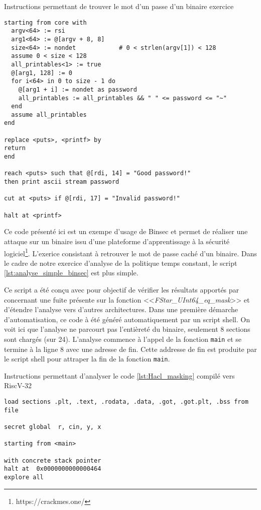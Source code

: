 \begin{listing}[!ht]
    \caption{Instructions permettant de trouver le mot d'un passe d'un binaire exercice}
    \label{lst:exemple_binsec}
    \begin{verbatim}
starting from core with
  argv<64> := rsi
  arg1<64> := @[argv + 8, 8]
  size<64> := nondet            # 0 < strlen(argv[1]) < 128
  assume 0 < size < 128
  all_printables<1> := true
  @[arg1, 128] := 0
  for i<64> in 0 to size - 1 do
    @[arg1 + i] := nondet as password
    all_printables := all_printables && " " <= password <= "~"
  end
  assume all_printables
end

replace <puts>, <printf> by
return
end

reach <puts> such that @[rdi, 14] = "Good password!"
then print ascii stream password

cut at <puts> if @[rdi, 17] = "Invalid password!"

halt at <printf>
\end{verbatim}
\end{listing}

Ce code présenté ici est un exempe d'usage de Binsec et permet de réaliser une attaque sur un binaire issu d'une plateforme d'apprentissage à la sécurité logiciel\footnote{https://crackmes.one/}. L'exerice consistant à retrouver le mot de passe caché d'un binaire. Dans le cadre de notre exercice d'analyse de la politique temps constant, le script \ref{lst:analyse_simple_binsec} est plus simple.\medbreak

Ce script a été conçu avec pour objectif de vérifier les résultats apportés par \cite{schneider2024breakingbadcompilersbreak} concernant une fuite présente sur la fonction <<\textit{FStar\_UInt64\_eq\_mask}>> et d'étendre l'analyse vers d'autres architectures. Dans une première démarche d'automatisation, ce code à été généré automatiquement par un script shell. On voit ici que l'analyse ne parcourt pas l'entièreté du binaire, seulement 8 sections sont chargés (sur 24). L'analyse commence à l'appel de la fonction \texttt{main} et se termine à la ligne 8 avec une adresse de fin. Cette addresse de fin est produite par le script shell pour attraper la fin de la fonction \texttt{main}. 

\begin{listing}[!ht]
    \caption{Instructions permettant d'analyser le code \ref{lst:Hacl_masking} compilé vers RiscV-32}
    \label{lst:analyse_simple_binsec}
    \begin{verbatim}
load sections .plt, .text, .rodata, .data, .got, .got.plt, .bss from file

secret global  r, cin, y, x

starting from <main>

with concrete stack pointer
halt at  0x0000000000000464
explore all

\end{verbatim}
\end{listing}


